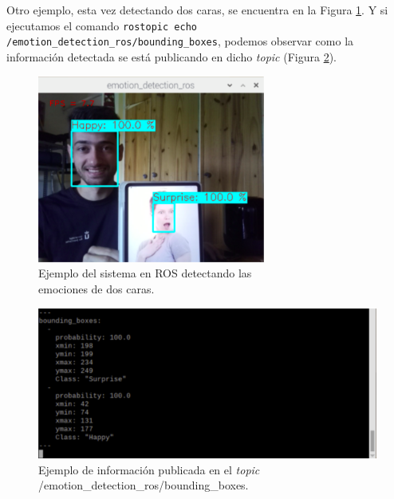 Otro ejemplo, esta vez detectando dos caras, se encuentra en la Figura \ref{fig:ventana_grafica_2_caras}. Y si ejecutamos el comando \verb|rostopic echo /emotion_detection_ros/bounding_boxes|, podemos observar como la información detectada se está publicando en dicho \textit{topic} (Figura \ref{fig:ejemplo_salida_topic}).\\

\begin{figure} [h!]
  \begin{center}
    \includegraphics[width=75mm]{figs/prediccion_happy_surprise.png}
  \end{center}
  \captionsetup{justification=centering}
  \caption{Ejemplo del sistema en ROS detectando las\\
  emociones de dos caras.}
  \label{fig:ventana_grafica_2_caras}
\end{figure}

\begin{figure} [h!]
  \begin{center}
    \includegraphics[width=13cm]{figs/salida_topic.png}
  \end{center}
  \captionsetup{justification=centering}
  \caption{Ejemplo de información publicada en el \textit{topic}\\
  /emotion\_detection\_ros/bounding\_boxes.}
  \label{fig:ejemplo_salida_topic}
\end{figure}

